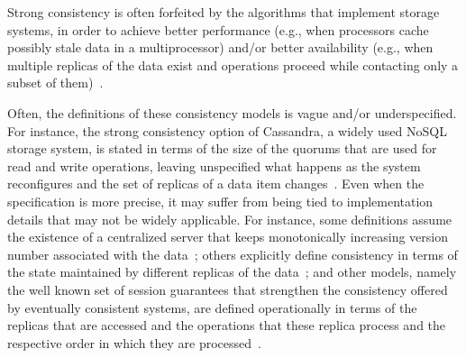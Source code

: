 \documentclass[journal,compsoc]{IEEEtran}
\begin{document}
Strong consistency is often forfeited by the algorithms that implement storage systems, in order to achieve better performance (e.g., when processors cache possibly stale data in a multiprocessor) and/or better availability (e.g., when multiple replicas of the data exist and operations proceed while contacting only a subset of them)~\cite{Lakshman:2010:CDS:1773912.1773922, Sumbaly_servinglarge-scale, Meiklejohn:2013:RPD:2505305.2505309, Plugge:2010:DGM:1869938, Schutt:2008:SRT:1411273.1411280, DeCandia:2007:DAH:1323293.1294281}.

Often, the definitions of these consistency models is vague and/or underspecified. For instance, the strong consistency option of Cassandra, a widely used NoSQL storage system, is stated in terms of the size of the quorums that are used for read and write operations, leaving unspecified what happens as the system reconfigures and the set of replicas of a data item changes~\cite{cassandra-consistency}.
Even when the specification is more precise, it may suffer from being tied to implementation details that may not be widely applicable. For instance, some definitions assume the existence of a centralized server that keeps monotonically increasing version number associated with the data~\cite{DBLP:conf/icde/AdyaLO00}; others explicitly define consistency in terms of the state maintained by different replicas of the data~\cite{Li:2012:MGS:2387880.2387906}; and other models, namely the well known set of session guarantees that strengthen the consistency offered by eventually consistent systems, are defined operationally in terms of the replicas that are accessed and the operations that these replica process and the respective order in which they are processed~\cite{bayou}. 
\end{document}
